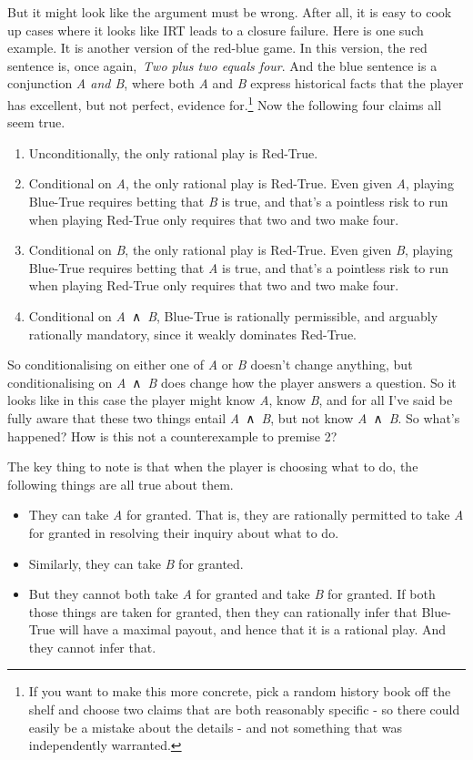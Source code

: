 \documentclass[
  12pt,
  letterpaper,
]{scrbook}
\providecommand{\tightlist}{%
  \setlength{\itemsep}{0pt}\setlength{\parskip}{0pt}}\usepackage{longtable,booktabs,array}
\begin{document}
But it might look like the argument must be wrong. After all, it is easy
to cook up cases where it looks like IRT leads to a closure failure.
Here is one such example. It is another version of the red-blue game. In
this version, the red sentence is, once again,~\emph{Two plus two equals
four}. And the blue sentence is a conjunction \emph{A and B}, where both
\emph{A} and \emph{B} express historical facts that the player has
excellent, but not perfect, evidence for.\footnote{If you want to make
  this more concrete, pick a random history book off the shelf and
  choose two claims that are both reasonably specific - so there could
  easily be a mistake about the details - and not something that was
  independently warranted.} Now the following four claims all seem true.

\begin{enumerate}
\def\labelenumi{\arabic{enumi}.}
\tightlist
\item
  Unconditionally, the only rational play is Red-True.
\item
  Conditional on \emph{A}, the only rational play is Red-True. Even
  given \emph{A}, playing Blue-True requires betting that \emph{B} is
  true, and that's a pointless risk to run when playing Red-True only
  requires that two and two make four.
\item
  Conditional on \emph{B}, the only rational play is Red-True. Even
  given \emph{B}, playing Blue-True requires betting that \emph{A} is
  true, and that's a pointless risk to run when playing Red-True only
  requires that two and two make four.
\item
  Conditional on \emph{A}~∧~\emph{B}, Blue-True is rationally
  permissible, and arguably rationally mandatory, since it weakly
  dominates Red-True.
\end{enumerate}

So conditionalising on either one of \emph{A} or \emph{B} doesn't change
anything, but conditionalising on \emph{A}~∧~\emph{B} does change how
the player answers a question. So it looks like in this case the player
might know \emph{A}, know \emph{B}, and for all I've said be fully aware
that these two things entail \emph{A}~∧~\emph{B}, but not know
\emph{A}~∧~\emph{B}. So what's happened? How is this not a
counterexample to premise 2?

The key thing to note is that when the player is choosing what to do,
the following things are all true about them.

\begin{itemize}
\tightlist
\item
  They can take \emph{A} for granted. That is, they are rationally
  permitted to take \emph{A} for granted in resolving their inquiry
  about what to do.
\item
  Similarly, they can take \emph{B} for granted.
\item
  But they cannot both take \emph{A} for granted and take \emph{B} for
  granted. If both those things are taken for granted, then they can
  rationally infer that Blue-True will have a maximal payout, and hence
  that it is a rational play. And they cannot infer that.
\end{itemize}
\end{document}
